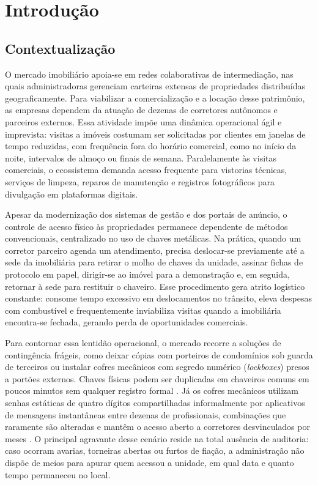 \chapter{Introdução}
\label{cap:introducao}

\section{Contextualização}
\label{sec:contextualizacao}

O mercado imobiliário apoia-se em redes colaborativas de intermediação, nas quais administradoras gerenciam carteiras extensas de propriedades distribuídas geograficamente. Para viabilizar a comercialização e a locação desse patrimônio, as empresas dependem da atuação de dezenas de corretores autônomos e parceiros externos. Essa atividade impõe uma dinâmica operacional ágil e imprevista: visitas a imóveis costumam ser solicitadas por clientes em janelas de tempo reduzidas, com frequência fora do horário comercial, como no início da noite, intervalos de almoço ou finais de semana. Paralelamente às visitas comerciais, o ecossistema demanda acesso frequente para vistorias técnicas, serviços de limpeza, reparos de manutenção e registros fotográficos para divulgação em plataformas digitais.

Apesar da modernização dos sistemas de gestão e dos portais de anúncio, o controle de acesso físico às propriedades permanece dependente de métodos convencionais, centralizado no uso de chaves metálicas. Na prática, quando um corretor parceiro agenda um atendimento, precisa deslocar-se previamente até a sede da imobiliária para retirar o molho de chaves da unidade, assinar fichas de protocolo em papel, dirigir-se ao imóvel para a demonstração e, em seguida, retornar à sede para restituir o chaveiro. Esse procedimento gera atrito logístico constante: consome tempo excessivo em deslocamentos no trânsito, eleva despesas com combustível e frequentemente inviabiliza visitas quando a imobiliária encontra-se fechada, gerando perda de oportunidades comerciais.

Para contornar essa lentidão operacional, o mercado recorre a soluções de contingência frágeis, como deixar cópias com porteiros de condomínios sob guarda de terceiros ou instalar cofres mecânicos com segredo numérico (\textit{lockboxes}) presos a portões externos. Chaves físicas podem ser duplicadas em chaveiros comuns em poucos minutos sem qualquer registro formal \cite{camargosilvablockchain2023}. Já os cofres mecânicos utilizam senhas estáticas de quatro dígitos compartilhadas informalmente por aplicativos de mensagens instantâneas entre dezenas de profissionais, combinações que raramente são alteradas e mantêm o acesso aberto a corretores desvinculados por meses \cite{satanasaowapak2021}. O principal agravante desse cenário reside na total ausência de auditoria: caso ocorram avarias, torneiras abertas ou furtos de fiação, a administração não dispõe de meios para apurar quem acessou a unidade, em qual data e quanto tempo permaneceu no local.


